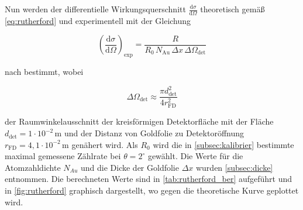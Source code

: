 \begin{table}[H]
    \centering
    \caption{Messwerte zur Zählrate R in Abhängigkeit vom Streuwinkel $\theta$.}
    \label{tab:rutherford-messwerte}
\end{table}

Nun werden der differentielle Wirkungsquerschnitt $\frac{\mathrm{d}\sigma}{\mathrm{d}\Omega}$ theoretisch gemäß \eqref{eq:rutherford} und experimentell mit der Gleichung

\[
\left(\frac{\mathrm{d}\sigma}{\mathrm{d}\Omega}\right)_{\mathrm{exp}}
=
\frac{R}
{R_0\,N_{\mathrm{Au}}\,\Delta x\,\Delta\Omega_{\mathrm{det}}}
\]

nach \cite{kstateRutherford} bestimmt, wobei 

\[
\Delta\Omega_{\mathrm{det}}
\approx
\frac{\pi d_{\mathrm{det}}^2}{4r_{\mathrm{FD}}^2}
\]

der Raumwinkelausschnitt der kreisförmigen Detektorfläche mit der Fläche\\
$d_{\mathrm{det}} = 1 \cdot 10^{-2}\,\mathrm{m}$  und der Distanz von 
Goldfolie zu Detektoröffnung $r_{\mathrm{FD}} = 4{,}1 \cdot 10^{-2}\,\mathrm{m}$ \cite{tudoV16} genähert wird.
Als $R_0$ wird die in \autoref{subsec:kalibrier} bestimmte maximal gemessene Zählrate bei $\theta = 2^\circ$ gewählt.
Die Werte für die Atomzahldichte $N_{Au}$ und die Dicke der Goldfolie $\Delta x$ wurden \autoref{subsec:dicke} entnommen.
Die berechneten Werte sind in \autoref{tab:rutherford_ber} aufgeführt und in \autoref{fig:rutherford} graphisch dargestellt, wo gegen die theoretische Kurve geplottet wird.

